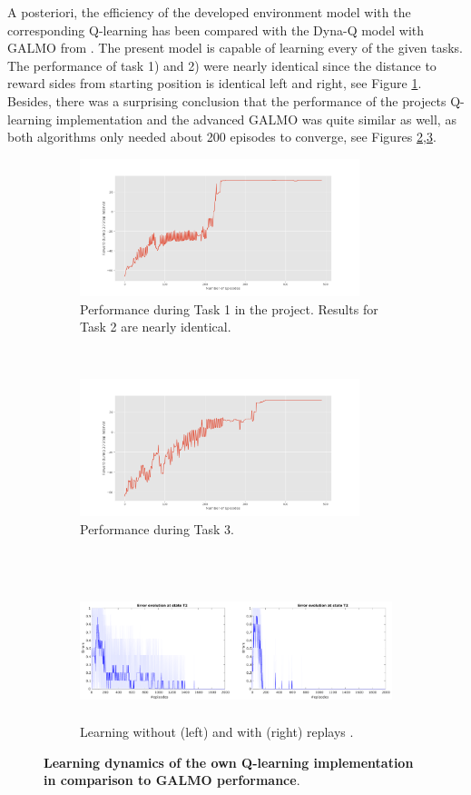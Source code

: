 \documentclass[a4paper]{article}
\begin{document}
	\par A posteriori, the efficiency of the developed environment model with the corresponding Q-learning has been compared with the Dyna-Q model with GALMO from \citet{NeuralDynaQ}. The present model is capable of learning every of the given tasks. The performance of task 1) and 2) were nearly identical since the distance to reward sides from starting position is identical left and right, see Figure \ref{fig:task12}. \\
	Besides, there was a surprising conclusion that the performance of the projects Q-learning implementation and the advanced GALMO was quite similar as well, as both algorithms only needed about 200 episodes to converge, see Figures \ref{fig:task3},\ref{fig:galmo}.  
	\begin{figure}[h]
		\centering
		\begin{subfigure}{1\textwidth}
			\centering
			\includegraphics[height=4cm]{./figs/Task1.png}
			\caption{Performance during Task 1 in the project. Results for Task 2 are nearly identical.}
			\label{fig:task12}
		\end{subfigure}\\
		\begin{subfigure}{1\textwidth}
			\centering
			\includegraphics[height=4cm]{./figs/Task3.png}
			\caption{Performance during Task 3.}
			\label{fig:task3}
		\end{subfigure}\\
		\begin{subfigure}{1\textwidth}
			\centering
			\includegraphics[height=4cm]{./figs/QvsDyna2.pdf}
			\caption{Learning without (left) and with (right) replays \citep{NeuralDynaQ}.}
			\label{fig:galmo}
		\end{subfigure}
		\caption{\textbf{Learning dynamics of the own Q-learning implementation in comparison to GALMO performance}.}
		\label{fig:tasks}
	\end{figure}
	
\end{document}
